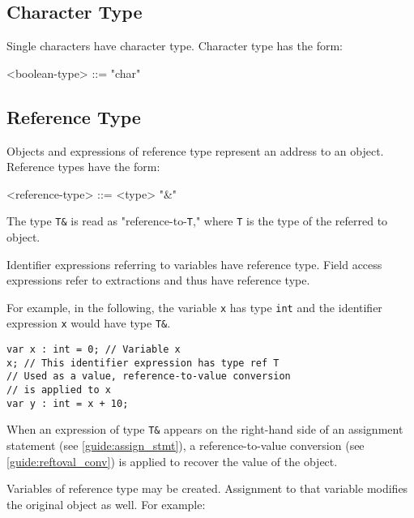 \subsection{Character Type} \label{guide:char_type}

Single characters have character type. Character type has the form: 

\begin{minip}
\begin{grammar}
<boolean-type> ::= "char"
\end{grammar}
\end{minip}

\subsection{Reference Type} \label{guide:ref_type}

Objects and expressions of reference type represent an address to an object.  Reference types have the form:

\begin{minip}
\begin{grammar}
<reference-type> ::= <type> "\&" 
\end{grammar}
\end{minip}

The type \texttt{T\&} is read as "reference-to-\texttt{T}," where \texttt{T} is the type of the referred to object.

Identifier expressions referring to variables have reference type. Field access expressions refer to extractions and thus have reference type.

For example, in the following, the variable \texttt{x} has type \texttt{int} and the identifier expression \texttt{x} would have type \texttt{T\&}.

\begin{minip}
\begin{lstlisting}
var x : int = 0; // Variable x
x; // This identifier expression has type ref T
// Used as a value, reference-to-value conversion
// is applied to x
var y : int = x + 10;
\end{lstlisting}
\end{minip}

When an expression of type \texttt{T\&} appears on the right-hand side of an
assignment statement (see \ref{guide:assign_stmt}), a reference-to-value
conversion (see \ref{guide:reftoval_conv}) is applied to recover the value of the object.

Variables of reference type may be created. Assignment to that variable modifies the original object as well. For example:

